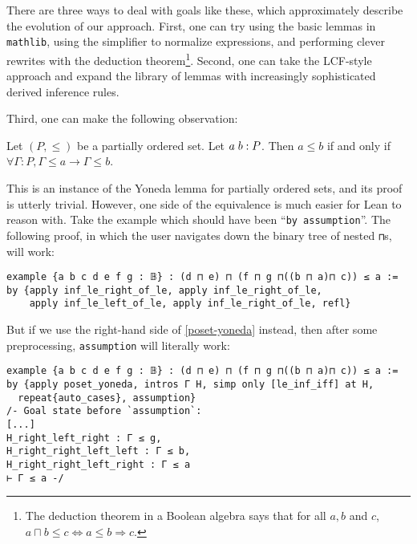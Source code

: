 \documentclass[a4paper,USenglish,cleveref, autoref]{lipics-v2019}
\newcommand{\lil}{\lstinline}
\begin{document}
There are three ways to deal with goals like these, which approximately describe the evolution of our approach. First, one can try using the basic lemmas in \lil{mathlib}, using the simplifier to normalize expressions, and performing clever rewrites with the deduction theorem\footnote{The deduction theorem in a Boolean algebra says that for all $a, b$ and $c$, $a \sqcap b \leq c \iff a \leq b \Rightarrow c$.}. Second, one can take the LCF-style approach and expand the library of lemmas with increasingly sophisticated derived inference rules.

Third, one can make the following observation:

\begin{lemma}\label{poset-yoneda}
  Let $(P, \leq)$ be a partially ordered set. Let $a \hspace{1mm} b : P$. Then $a \leq b$ if and only if $\forall \Gamma : P, \Gamma \leq a \to \Gamma \leq b$.
\end{lemma}
This is an instance of the Yoneda lemma for partially ordered sets, and its proof is utterly trivial. However, one side of the equivalence is much easier for Lean to reason with. Take the example which should have been ``\lil{by assumption}''. The following proof, in which the user navigates down the binary tree of nested \lil{⊓}s, will work:
\begin{lstlisting}
example {a b c d e f g : 𝔹} : (d ⊓ e) ⊓ (f ⊓ g ⊓((b ⊓ a)⊓ c)) ≤ a :=
by {apply inf_le_right_of_le, apply inf_le_right_of_le,
    apply inf_le_left_of_le, apply inf_le_right_of_le, refl}
\end{lstlisting}

But if we use the right-hand side of \autoref{poset-yoneda} instead, then after some preprocessing, \lstinline{assumption} will literally work:

\begin{lstlisting}
example {a b c d e f g : 𝔹} : (d ⊓ e) ⊓ (f ⊓ g ⊓((b ⊓ a)⊓ c)) ≤ a :=
by {apply poset_yoneda, intros Γ H, simp only [le_inf_iff] at H,
  repeat{auto_cases}, assumption}
/- Goal state before `assumption`:
[...]
H_right_left_right : Γ ≤ g,
H_right_right_left_left : Γ ≤ b,
H_right_right_left_right : Γ ≤ a
⊢ Γ ≤ a -/
\end{lstlisting}
\end{document}
